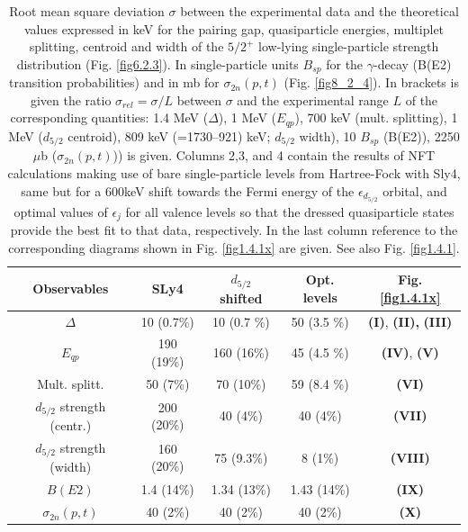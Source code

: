  \begin{table}
\begin{center}
\begin{tabular}{|c|c|c|c|c|}
\hline
  Observables  &  SLy4 &  $d_{5/2}$ shifted  & Opt. levels& Fig. \ref{fig1.4.1x} \\ 
\hline
$\Delta$ &  10  (0.7\%) &  10  (0.7 \%) & 50   (3.5 \%)&\textbf{(I)}, \textbf{(II),} \textbf{(III)}\\
 $E_{qp}$ & 190 (19\%)  & 160  (16\%)   & 45  (4.5 \%)& \textbf{(IV)}, \textbf{(V)}\\
 Mult.  splitt. & 50  (7\%) & 70  (10\%)    & 59  (8.4 \%)& \textbf{(VI)}\\
  $d_{5/2}$ strength (centr.) & 200  (20\%)  & 40  (4\%)   & 40  (4\%)& \textbf{(VII)} \\
$d_{5/2}$ strength (width) & 160  (20\%)  &75  (9.3\%)  &  8  (1\%)& \textbf{(VIII)}\\
$B(E2)$ & 1.4  (14\%) & 1.34  (13\%)   & 1.43  (14\%)& \textbf{(IX)}\\ 
$\sigma_{2n}(p,t)$ & 40 (2\%) & 40 (2\%) & 40 (2\%) &\textbf{(X)}\\
 \hline
\end{tabular}
\caption{Root  mean square deviation $\sigma$ between  the experimental data and the theoretical values expressed in keV for the pairing gap, quasiparticle energies, multiplet splitting, centroid and width of the  
$5/2^+$ low-lying single-particle strength distribution (Fig. \ref{fig6.2.3}). In single-particle units $B_{sp}$ for the $\gamma$-decay  (B(E2) transition probabilities) and in mb for $\sigma_{2n}(p,t)$ (Fig. \ref{fig8_2_4}). In brackets is given
the ratio $\sigma_{rel}=\sigma/L$ between $\sigma$ and the experimental  range $L$ of the corresponding quantities: 1.4 MeV ($\Delta$), 1 MeV ($E_{qp}$), 700 keV (mult. splitting), 
1 MeV ($d_{5/2}$ centroid),  809 keV (=1730--921) keV;  $d_{5/2}$ width), 10 $B_{sp}$ (B(E2)), 2250 $\mu$b ($\sigma_{2n}(p,t)$)) is given. Columns 2,3, and 4 contain the results of NFT calculations making use of bare single-particle levels from Hartree-Fock with Sly4, same but for a 600keV shift towards the Fermi energy of the $\epsilon_{d_{5/2}}$ orbital, and optimal values of $\epsilon_j$ for all valence levels so that the dressed quasiparticle states provide the best fit to that data, respectively. In the last column reference to the corresponding diagrams shown in Fig. \ref{fig1.4.1x} are given. See also Fig. \ref{fig1.4.1}.}
\label{tab1.4.1}
\end{center}
\end{table}



